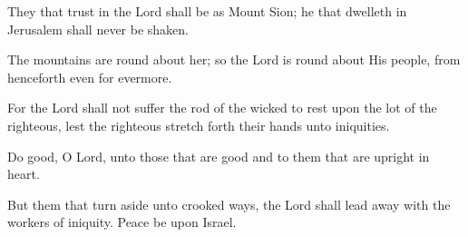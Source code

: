 They that trust in the Lord shall be as Mount Sion; he that dwelleth in Jerusalem shall never be shaken.

The mountains are round about her; so the Lord is round about His people, from henceforth even for evermore.

For the Lord shall not suffer the rod of the wicked to rest upon the lot of the righteous, lest the righteous stretch forth their hands unto iniquities.

Do good, O Lord, unto those that are good and to them that are upright in heart.

But them that turn aside unto crooked ways, the Lord shall lead away with the workers of iniquity. Peace be upon Israel.
